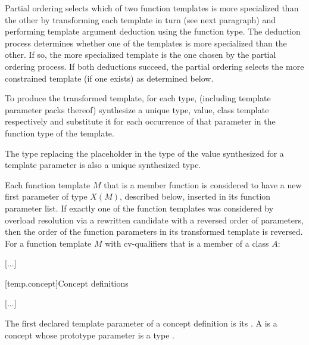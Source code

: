 \documentclass{wg21}
\begin{document}
\pnum
Partial ordering selects which of two function templates is more
specialized than the other by transforming each template in turn
(see next paragraph) and performing template argument deduction
using the function type.
The deduction process determines whether
one of the templates is more specialized than the other. If so, the
more specialized template is the one chosen by the partial ordering
process.
If both deductions succeed, the partial ordering selects
the more constrained template (if one exists) as determined below.
%

To produce the transformed template, for each type,  (including template parameter packs 
thereof) synthesize a unique type, value,  class template 
respectively and substitute it for each occurrence of that parameter
in the function type of the template.


\begin{note}
    The type replacing the placeholder
    in the type of the value synthesized for a  template parameter
    is also a unique synthesized type.
\end{note}
Each function template $M$ that is a member function
is considered to have
a new first parameter of type $X(M)$, described below,
inserted in its function parameter list.
If exactly one of the function templates was considered by overload resolution
via a rewritten candidate 
with a reversed order of parameters,
then the order of the function parameters in its transformed template
is reversed.
For a function template $M$ with cv-qualifiers \cv{}
that is a member of a class $A$:

\textcolor{noteclr}{[...]}

[temp.concept]{Concept definitions}

\textcolor{noteclr}{[...]}

\pnum
The first declared template parameter of a concept definition is its
.
%
A 
is a concept whose prototype parameter
is a type .
\end{document}
